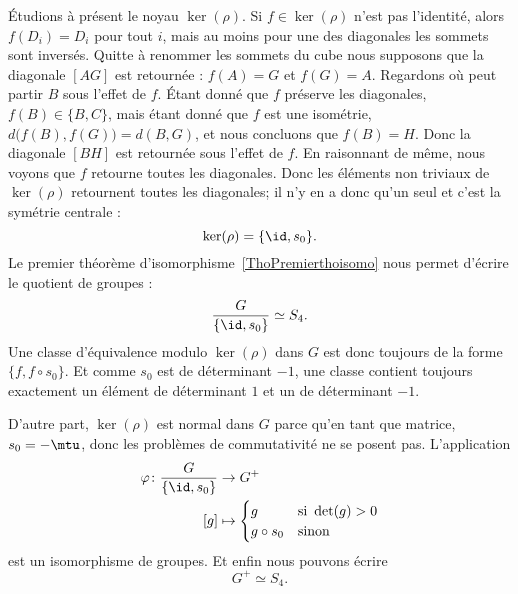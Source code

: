 Étudions à présent le noyau \( \ker(\rho)\). Si \( f\in\ker(\rho)\) n'est pas l'identité, alors \( f(D_i)=D_i\) pour tout \( i\), mais au moins pour une des diagonales les sommets sont inversés. Quitte à renommer les sommets du cube nous supposons que la diagonale \( [AG]\) est retournée : \( f(A)=G\) et \( f(G)=A\). Regardons où peut partir \( B\) sous l'effet de \( f\). Étant donné que \( f\) préserve les diagonales, \( f(B)\in\{ B,C \}\), mais étant donné que \( f\) est une isométrie, \( d\big( f(B),f(G) \big)=d(B,G)\), et nous concluons que \( f(B)=H\). Donc la diagonale \( [BH]\) est retournée sous l'effet de \( f\). En raisonnant de même, nous voyons que \( f\) retourne toutes les diagonales. Donc les éléments non triviaux de \( \ker(\rho)\) retournent toutes les diagonales; il n'y en a donc qu'un seul et c'est la symétrie centrale :
\begin{equation}
	\ker(\rho)=\{ \id,s_0 \}.
\end{equation}
Le premier théorème d'isomorphisme~\ref{ThoPremierthoisomo} nous permet d'écrire le quotient de groupes :
\begin{equation}
	\frac{ G }{ \{ \id,s_0 \} }\simeq S_4.
\end{equation}
Une classe d'équivalence modulo \( \ker(\rho)\) dans \( G\) est donc toujours de la forme \( \{ f,f\circ s_0 \}\). Et comme \( s_0\) est de déterminant \( -1\), une classe contient toujours exactement un élément de déterminant \( 1\) et un de déterminant \( -1\).

D'autre part, \( \ker(\rho)\) est normal dans \( G\) parce qu'en tant que matrice, \( s_0=-\mtu\), donc les problèmes de commutativité ne se posent pas. L'application
\begin{equation}
	\begin{aligned}
		\varphi\colon \frac{ G }{ \{ \id,s_0 \} } & \to G^+                             \\
		[g]                                       & \mapsto \begin{cases}
			g          & \text{si } \det(g)>0 \\
			g\circ s_0 & \text{sinon}
		\end{cases}
	\end{aligned}
\end{equation}
est un isomorphisme de groupes. Et enfin nous pouvons écrire
\begin{equation}
	G^+\simeq S_4.
\end{equation}

